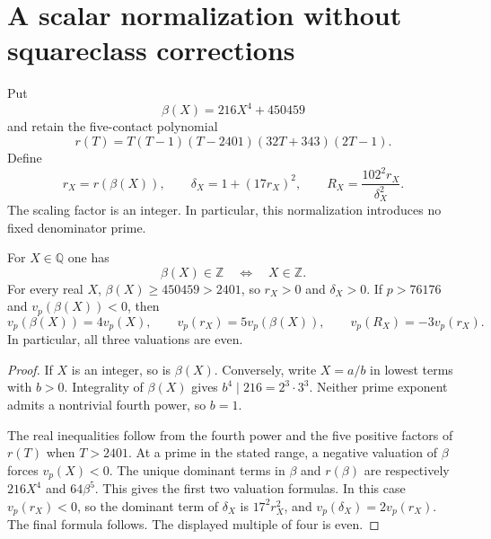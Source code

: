 \section{A scalar normalization without squareclass corrections}
\label{sec:scalar-correction-free}

Put
\[
                         \beta(X)=216X^4+450459
\]
and retain the five-contact polynomial
\[
 r(T)=T(T-1)(T-2401)(32T+343)(2T-1).
\]
Define
\[
 r_X=r(\beta(X)),\qquad
 \delta_X=1+(17r_X)^2,\qquad
 R_X=\frac{102^2r_X}{\delta_X^2}.
\]
The scaling factor is an integer.  In particular, this normalization
introduces no fixed denominator prime.

\begin{lemma}\label{sn:integral-input}
For $X\in\mathbb Q$ one has
\[
                 \beta(X)\in\mathbb Z
                 \quad\Longleftrightarrow\quad X\in\mathbb Z.
\]
For every real $X$, $\beta(X)\ge450459>2401$, so $r_X>0$
and $\delta_X>0$.  If $p>76176$ and $v_p(\beta(X))<0$,
then
\[
 v_p(\beta(X))=4v_p(X),\qquad
 v_p(r_X)=5v_p(\beta(X)),\qquad
 v_p(R_X)=-3v_p(r_X).
\]
In particular, all three valuations are even.
\end{lemma}
\begin{proof}
If $X$ is an integer, so is $\beta(X)$.  Conversely, write
$X=a/b$ in lowest terms with $b>0$.  Integrality of $\beta(X)$
gives $b^4\mid216=2^3\cdot3^3$.  Neither prime exponent
admits a nontrivial fourth power, so $b=1$.

The real inequalities follow from the fourth power and the
five positive factors of $r(T)$ when $T>2401$.  At a prime
in the stated range, a negative valuation of $\beta$ forces
$v_p(X)<0$.  The unique dominant terms in $\beta$ and
$r(\beta)$ are respectively $216X^4$ and $64\beta^5$.
This gives the first two valuation formulas.  In this case
$v_p(r_X)<0$, so the dominant term of $\delta_X$ is
$17^2r_X^2$, and $v_p(\delta_X)=2v_p(r_X)$.  The final
formula follows.  The displayed multiple of four is even.
\end{proof}

